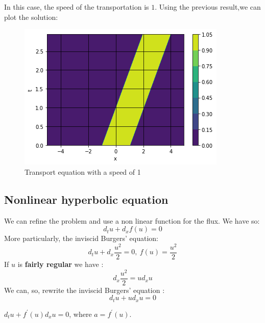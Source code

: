         In this case, the speed of the transportation is $1$. Using the previous result,we can plot the solution:
        
        
        \begin{figure}
            \center
            \includegraphics{transport.png}
            \caption{Transport equation with a speed of 1}
        \end{figure}
        

    \subsection{Nonlinear hyperbolic equation}
    
        We can refine the problem and use a non linear function for the flux. We have so: 
        \begin{equation*}
            d_t u+ d_x f\left(u\right) = 0
        \end{equation*}
        More particularly, the inviscid Burgers' equation:
        \begin{equation}
            d_t u + d_x \frac{u^2}{2} = 0, ~f\left(u\right) = \frac{u^2}{2}
        \end{equation}
        If $u$ is {\bf fairly regular} we have :
        \begin{equation*}
            d_x \frac{u^2}{2} = u d_x u
        \end{equation*}
        We can, so, rewrite the inviscid Burgers' equation :
        \begin{equation*}
            d_t u + u d_x u = 0
        \end{equation*}
    
        \begin{remark}
            $d_t u + f^\prime \left(u\right) d_x u = 0$, where $a=f^\prime\left(u\right)$. 
        \end{remark}
    
